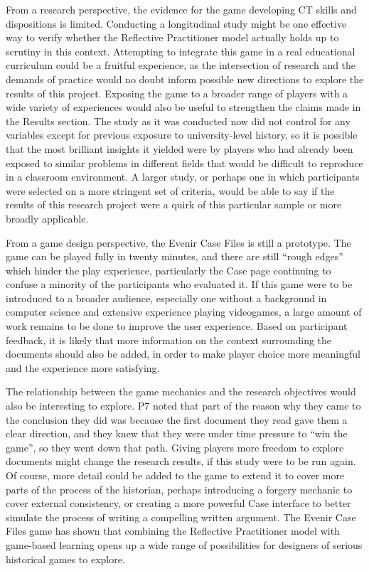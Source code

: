 \documentclass{l4proj}
\begin{document}
From a research perspective, the evidence for the game developing CT skills and dispositions is limited. Conducting a longitudinal study might be one effective way to verify whether the Reflective Practitioner model actually holds up to scrutiny in this context. Attempting to integrate this game in a real educational curriculum could be a fruitful experience, as the intersection of research and the demands of practice would no doubt inform possible new directions to explore the results of this project. Exposing the game to a broader range of players with a wide variety of experiences would also be useful to strengthen the claims made in the Results section. The study as it was conducted now did not control for any variables except for previous exposure to university-level history, so it is possible that the most brilliant insights it yielded were by players who had already been exposed to similar problems in different fields that would be difficult to reproduce in a classroom environment. A larger study, or perhaps one in which participants were selected on a more stringent set of criteria, would be able to say if the results of this research project were a quirk of this particular sample or more broadly applicable. 

From a game design perspective, the Evenir Case Files is still a prototype. The game can be played fully in twenty minutes, and there are still “rough edges” which hinder the play experience, particularly the Case page continuing to confuse a minority of the participants who evaluated it. If this game were to be introduced to a broader audience, especially one without a background in computer science and extensive experience playing videogames, a large amount of work remains to be done to improve the user experience. Based on participant feedback, it is likely that more information on the context surrounding the documents should also be added, in order to make player choice more meaningful and the experience more satisfying.

The relationship between the game mechanics and the research objectives would also be interesting to explore. P7 noted that part of the reason why they came to the conclusion they did was because the first document they read gave them a clear direction, and they knew that they were under time pressure to “win the game”, so they went down that path. Giving players more freedom to explore documents might change the research results, if this study were to be run again. Of course, more detail could be added to the game to extend it to cover more parts of the process of the historian, perhaps introducing a forgery mechanic to cover external consistency, or creating a more powerful Case interface to better simulate the process of writing a compelling written argument. The Evenir Case Files game has shown that combining the Reflective Practitioner model with game-based learning opens up a wide range of possibilities for designers of serious historical games to explore. 
\end{document}
